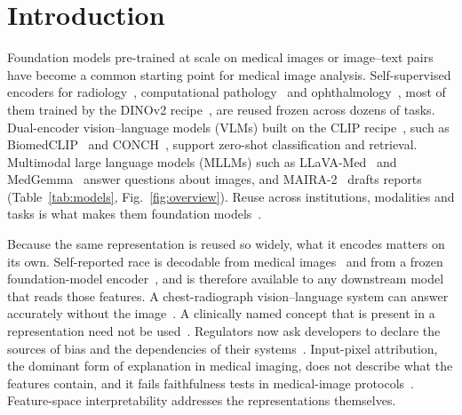 \section{Introduction}
\label{sec:intro}

Foundation models pre-trained at scale on medical images or image--text pairs have become a common
starting point for medical image analysis. Self-supervised encoders for
radiology~\cite{perezgarcia2024scalable}, computational
pathology~\cite{chen2024generalpurpose,xu2024wholeslide,vorontsov2024model} and
ophthalmology~\cite{zhou2023model}, most of them trained by the DINOv2 recipe~\cite{oquab2024dinov2}, are
reused frozen across dozens of tasks. Dual-encoder vision--language models (VLMs) built on the CLIP
recipe~\cite{radford2021learning}, such as BiomedCLIP~\cite{zhang2023biomedclip} and
CONCH~\cite{lu2024visuallanguage}, support zero-shot classification and retrieval. Multimodal large
language models (MLLMs) such as LLaVA-Med~\cite{li2023llavamed} and MedGemma~\cite{sellergren2025medgemma}
answer questions about images, and MAIRA-2~\cite{bannur2024maira2} drafts reports
(Table~\ref{tab:models}, Fig.~\ref{fig:overview}). Reuse across institutions, modalities and tasks is what
makes them foundation models~\cite{bommasani2021opportunities}.

Because the same representation is reused so widely, what it encodes matters on its own. Self-reported race
is decodable from medical images~\cite{banerjee2021ai} and from a frozen foundation-model
encoder~\cite{zheng2024demographic}, and is therefore available to any downstream model that reads those
features. A chest-radiograph vision--language system can answer accurately without the
image~\cite{lotfinia2026vision}. A clinically named concept that is present in a representation need not
be used~\cite{basu2026interpretability}. Regulators now ask developers to declare the sources of bias and
the dependencies of their systems~\cite{fda2025aiguidance,euaiact2024}. Input-pixel attribution, the
dominant form of explanation in medical imaging, does not describe what the features contain, and it fails
faithfulness tests in medical-image protocols~\cite{arun2021trustworthiness,sadanandan2026attention}.
Feature-space interpretability addresses the representations themselves.

